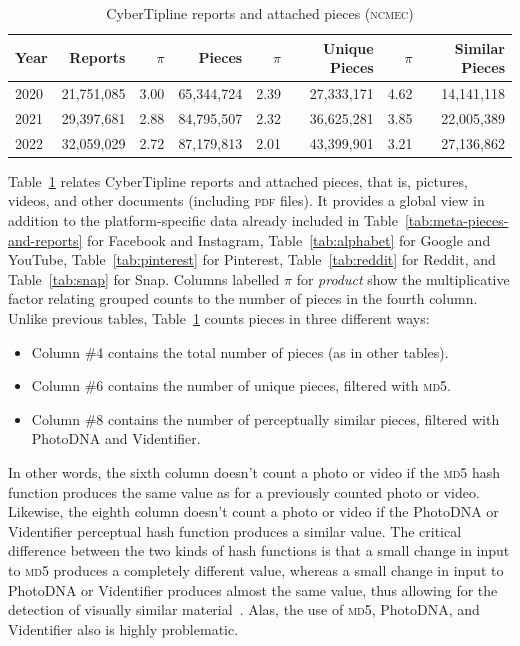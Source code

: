 \documentclass[nonacm,screen]{acmart}
\newcommand\V[1]{\textsc{\MakeLowercase{#1}}}
\begin{document}
\begin{table}
\centering\libertineLF
\caption{CyberTipline reports and attached pieces (\V{NCMEC})}
\label{tab:reports-pieces}
\begin{tabular}{l|rr|r|rr|rr}
\textbf{Year} & \textbf{Reports} & $\pi$ & \textbf{Pieces}
& $\pi$ & \textbf{Unique Pieces} & $\pi$ & \textbf{Similar Pieces} \\ \hline
2020 & 21,751,085 & 3.00 & 65,344,724 & 2.39 & 27,333,171 & 4.62 & 14,141,118 \\
2021 & 29,397,681 & 2.88 & 84,795,507 & 2.32 & 36,625,281 & 3.85 & 22,005,389 \\
2022 & 32,059,029 & 2.72 & 87,179,813 & 2.01 & 43,399,901 & 3.21 & 27,136,862 \\
\end{tabular}
\end{table}

Table~\ref{tab:reports-pieces} relates CyberTipline reports and attached pieces,
that is, pictures, videos, and other documents (including \V{PDF} files). It
provides a global view in addition to the platform-specific data already
included in Table~\ref{tab:meta-pieces-and-reports} for Facebook and Instagram,
Table~\ref{tab:alphabet} for Google and YouTube, Table~\ref{tab:pinterest} for
Pinterest, Table~\ref{tab:reddit} for Reddit, and Table~\ref{tab:snap} for Snap.
Columns labelled $\pi$ for \emph{product} show the multiplicative factor
relating grouped counts to the number of pieces in the fourth column. Unlike
previous tables, Table~\ref{tab:reports-pieces} counts pieces in three different
ways:
\begin{itemize}
    \item Column \#4 contains the total number of pieces (as in other tables).
    \item Column \#6 contains the number of unique pieces, filtered with \V{MD5}.
    \item Column \#8 contains the number of perceptually similar pieces,
    filtered with PhotoDNA and Videntifier.
\end{itemize}
In other words, the sixth column doesn't count a photo or video if the \V{MD5}
hash function produces the same value as for a previously counted photo or
video. Likewise, the eighth column doesn't count a photo or video if the
PhotoDNA or Videntifier perceptual hash function produces a similar value. The
critical difference between the two kinds of hash functions is that a small
change in input to \V{MD5} produces a completely different value, whereas a
small change in input to PhotoDNA or Videntifier produces almost the same value,
thus allowing for the detection of visually similar material~\cite{Farid2021}.
Alas, the use of \V{MD5}, PhotoDNA, and Videntifier also is highly problematic.
\end{document}
